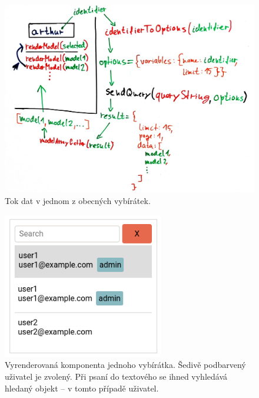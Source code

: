 \begin{figure}[!htb] \centering
  \includegraphics[width=145mm]{../img/picker_lifecycle.jpg}
  \caption{Tok dat v jednom z obecných vybírátek.}
  \label{fig:picker_lifecycle}
\end{figure}

\begin{figure}[!htb] \centering
  \includegraphics[width=70mm]{../img/picker_component.png}
  \caption[Vyrenderovaná komponenta jednoho vybírátka.]{Vyrenderovaná komponenta jednoho vybírátka. Šedivě podbarvený uživatel je zvolený.
  Při psaní do textového se ihned vyhledává hledaný objekt -- v tomto případě uživatel.}
  \label{fig:picker_component}
\end{figure}
